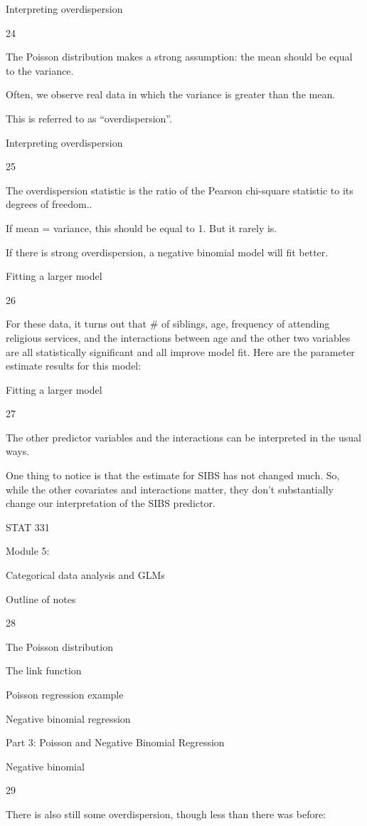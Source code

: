 \documentclass[
  letterpaper,
  DIV=11,
  numbers=noendperiod]{scrreprt}
\begin{document}
Interpreting overdispersion

24

The Poisson distribution makes a strong assumption: the mean should be
equal to the variance.

Often, we observe real data in which the variance is greater than the
mean.

This is referred to as ``overdispersion''.

Interpreting overdispersion

25

The overdispersion statistic is the ratio of the Pearson chi-square
statistic to its degrees of freedom..

If mean = variance, this should be equal to 1. But it rarely is.

If there is strong overdispersion, a negative binomial model will fit
better.

Fitting a larger model

26

For these data, it turns out that \# of siblings, age, frequency of
attending religious services, and the interactions between age and the
other two variables are all statistically significant and all improve
model fit. Here are the parameter estimate results for this model:

Fitting a larger model

27

The other predictor variables and the interactions can be interpreted in
the usual ways.

One thing to notice is that the estimate for SIBS has not changed much.
So, while the other covariates and interactions matter, they don't
substantially change our interpretation of the SIBS predictor.

STAT 331

Module 5:

Categorical data analysis and GLMs

Outline of notes

28

The Poisson distribution

The link function

Poisson regression example

Negative binomial regression

Part 3: Poisson and Negative Binomial Regression

Negative binomial

29

There is also still some overdispersion, though less than there was
before:
\end{document}
